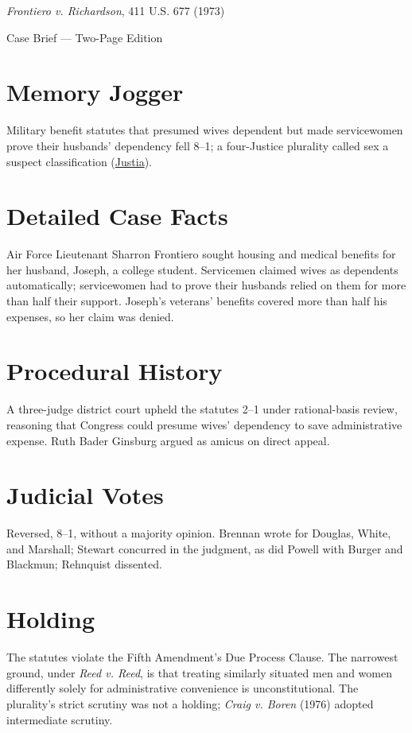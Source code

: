 \documentclass[12pt]{article}
\begin{document}
\begin{center}
{\LARGE \textit{Frontiero v. Richardson}, 411 U.S. 677 (1973)\par}
\vspace{0.5em}
{\large Case Brief --- Two-Page Edition\par}
\end{center}

\section{Memory Jogger}
Military benefit statutes that presumed wives dependent but made servicewomen prove their husbands' dependency fell 8--1; a four-Justice plurality called sex a suspect classification (\href{https://supreme.justia.com/cases/federal/us/411/677/}{Justia}).

\section{Detailed Case Facts}
Air Force Lieutenant Sharron Frontiero sought housing and medical benefits for her husband, Joseph, a college student. Servicemen claimed wives as dependents automatically; servicewomen had to prove their husbands relied on them for more than half their support. Joseph's veterans' benefits covered more than half his expenses, so her claim was denied.

\section{Procedural History}
A three-judge district court upheld the statutes 2--1 under rational-basis review, reasoning that Congress could presume wives' dependency to save administrative expense. Ruth Bader Ginsburg argued as amicus on direct appeal.

\section{Judicial Votes}
Reversed, 8--1, without a majority opinion. Brennan wrote for Douglas, White, and Marshall; Stewart concurred in the judgment, as did Powell with Burger and Blackmun; Rehnquist dissented.

\section{Holding}
The statutes violate the Fifth Amendment's Due Process Clause. The narrowest ground, under \textit{Reed v. Reed}, is that treating similarly situated men and women differently solely for administrative convenience is unconstitutional. The plurality's strict scrutiny was not a holding; \textit{Craig v. Boren} (1976) adopted intermediate scrutiny.
\end{document}

